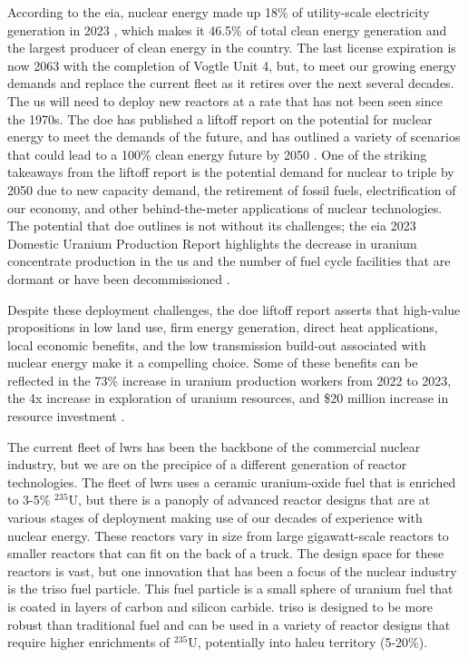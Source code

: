 According to the \gls{eia}, nuclear energy made up 18\% of utility-scale electricity generation in 2023 \cite{eia_elec_gen_2024}, which makes it 46.5\% of total clean energy generation and the largest producer of clean energy in the country. The last license expiration is now 2063 with the completion of Vogtle Unit 4, but, to meet our growing energy demands and replace the current fleet as it retires over the next several decades. The \gls{us} will need to deploy new reactors at a rate that has not been seen since the 1970s. The \gls{doe} has published a liftoff report on the potential for nuclear energy to meet the demands of the future, and has outlined a variety of scenarios that could lead to a 100\% clean energy future by 2050 \cite{julie_liftoff_pathways_2024}. One of the striking takeaways from the liftoff report is the potential demand for nuclear to triple by 2050 due to new capacity demand, the retirement of fossil fuels, electrification of our economy, and other behind-the-meter applications of nuclear technologies. The potential that \gls{doe} outlines is not without its challenges; the \gls{eia} 2023 Domestic Uranium Production Report highlights the decrease in uranium concentrate production in the \gls{us} and the number of fuel cycle facilities that are dormant or have been decommissioned \cite{eia_uranium_statistics_2023}.

Despite these deployment challenges, the \gls{doe} liftoff report asserts that high-value propositions in low land use, firm energy generation, direct heat applications, local economic benefits, and the low transmission build-out associated with nuclear energy make it a compelling choice. Some of these benefits can be reflected in the 73\% increase in uranium production workers from 2022 to 2023, the 4x increase in exploration of uranium resources, and \$20 million increase in resource investment \cite{eia_uranium_statistics_2023}.

The current fleet of \gls{lwr}s has been the backbone of the commercial nuclear industry, but we are on the precipice of a different generation of reactor technologies. The fleet of \gls{lwr}s uses a ceramic uranium-oxide fuel that is enriched to 3-5\% $^{235}$U, but there is a panoply of advanced reactor designs that are at various stages of deployment making use of our decades of experience with nuclear energy. These reactors vary in size from large gigawatt-scale reactors to smaller reactors that can fit on the back of a truck. The design space for these reactors is vast, but one innovation that has been a focus of the nuclear industry is the \gls{triso} fuel particle. This fuel particle is a small sphere of uranium fuel that is coated in layers of carbon and silicon carbide. \gls{triso} is designed to be more robust than traditional fuel and can be used in a variety of reactor designs that require higher enrichments of $^{235}$U, potentially into \gls{haleu} territory (5-20\%).

